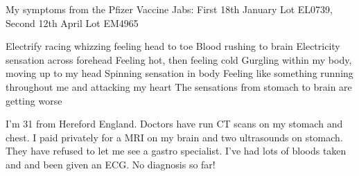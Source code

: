 My symptoms from the Pfizer Vaccine Jabs: First 18th January Lot EL0739, Second
12th April Lot EM4965

Electrify racing whizzing feeling head to toe Blood rushing to brain Electricity
sensation across forehead Feeling hot, then feeling cold Gurgling within my
body, moving up to my head Spinning sensation in body Feeling like something
running throughout me and attacking my heart The sensations from stomach to
brain are getting worse

I’m 31 from Hereford England. Doctors have run CT scans on my stomach and
chest. I paid privately for a MRI on my brain and two ultrasounds on
stomach. They have refused to let me see a gastro specialist. I’ve had lots of
bloods taken and and been given an ECG. No diagnosis so far!
